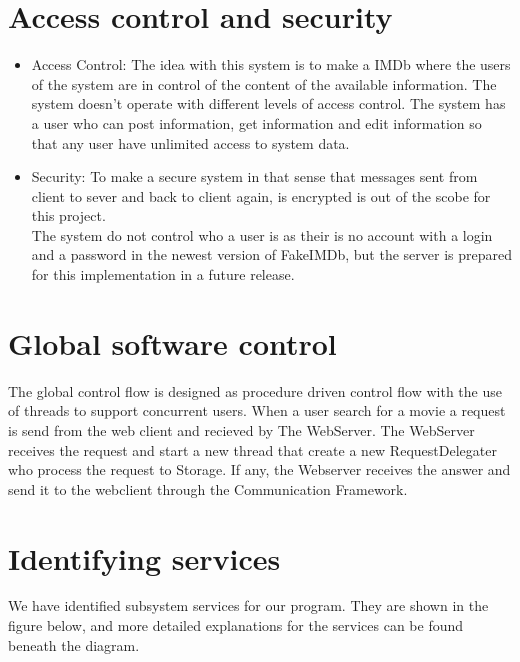 \section{Access control and security}
\begin{itemize}
\item Access Control: The idea with this system is to make a IMDb where the users of the system are in control of the content of the available information. The system doesn't operate with different levels of access control. The system has a user who can post information, get information and edit information so that any user have unlimited access to system data.
\item Security: To make a secure system in that sense that messages sent from client to sever and back to client again, is encrypted is out of the scobe for this project.\\
The system do not control who a user is as their is no account with a login and a password in the newest version of FakeIMDb, but the server is prepared for this implementation in a future release.
\end{itemize}

\section{Global software control}
The global control flow is designed as procedure driven control flow with the use of threads to support concurrent users. When a user search for a movie a request is send from the web client and recieved by The WebServer. The WebServer receives the request and start a new thread that create a new RequestDelegater who process the request to Storage. If any, the Webserver receives the answer and send it to the webclient through the Communication Framework.

\section{Identifying services}
We have identified subsystem services for our program. They are shown in the figure below, and more detailed explanations for the services can be found beneath the diagram.

